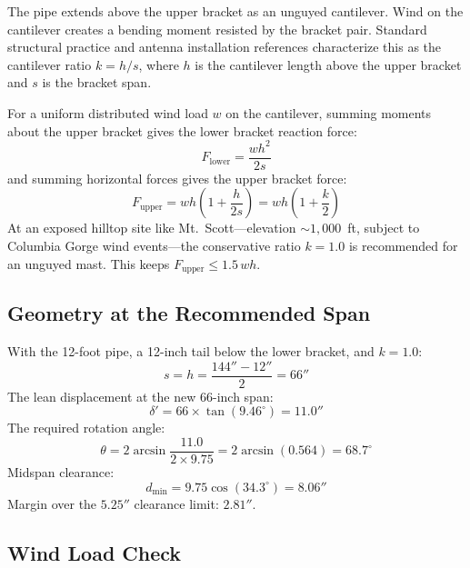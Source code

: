 \documentclass[11pt,twocolumn]{article}
\begin{document}
The pipe extends above the upper bracket as an unguyed cantilever. Wind on the
cantilever creates a bending moment resisted by the bracket pair. Standard
structural practice and antenna installation references \cite{ARRLAntenna,TIA222}
characterize this as the cantilever ratio $k = h/s$, where $h$ is the
cantilever length above the upper bracket and $s$ is the bracket span.

For a uniform distributed wind load $w$ on the cantilever, summing moments
about the upper bracket gives the lower bracket reaction force:
%
\begin{equation}
  F_\text{lower} = \frac{wh^2}{2s}
  \label{eq:Flower}
\end{equation}
%
and summing horizontal forces gives the upper bracket force:
%
\begin{equation}
  F_\text{upper} = wh\!\left(1 + \frac{h}{2s}\right) = wh\!\left(1 + \frac{k}{2}\right)
  \label{eq:Fupper}
\end{equation}
%
At an exposed hilltop site like Mt.\ Scott---elevation $\sim 1{,}000$~ft,
subject to Columbia Gorge wind events---the conservative ratio $k = 1.0$
is recommended for an unguyed mast. This keeps $F_\text{upper} \leq 1.5\,wh$.

\subsection{Geometry at the Recommended Span}

With the 12-foot pipe, a 12-inch tail below the lower bracket, and $k = 1.0$:
%
\begin{equation}
  s = h = \frac{144'' - 12''}{2} = 66''
\end{equation}
%
The lean displacement at the new 66-inch span:
%
\begin{equation}
  \delta' = 66 \times \tan(9.46^\circ) = 11.0''
\end{equation}
%
The required rotation angle:
%
\begin{equation}
  \theta = 2\arcsin\frac{11.0}{2 \times 9.75} = 2\arcsin(0.564) = 68.7^\circ
\end{equation}
%
Midspan clearance:
%
\begin{equation}
  d_\text{min} = 9.75\cos(34.3^\circ) = 8.06''
\end{equation}
%
Margin over the $5.25''$ clearance limit: $\mathbf{2.81''}$.

\subsection{Wind Load Check}
\end{document}
